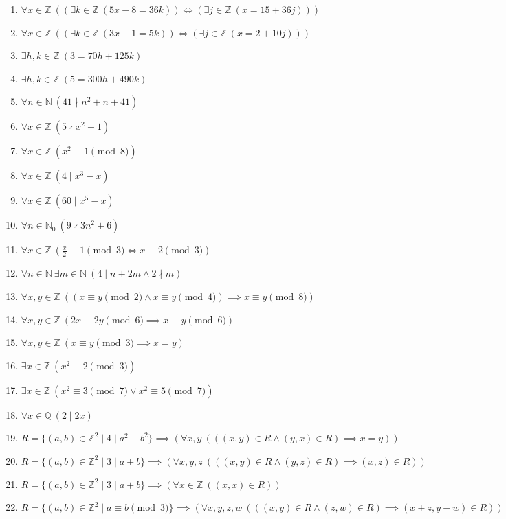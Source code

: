 \documentclass[11pt,a4paper]{article}
\begin{document}
\begin{enumerate}
\item $\displaystyle \forall x \in \mathbb{Z}\ ((\exists k \in \mathbb{Z}\ (5x - 8 = 36k)) \iff (\exists j \in \mathbb{Z}\ (x = 15 + 36j)))$
\item $\displaystyle \forall x \in \mathbb{Z}\ ((\exists k \in \mathbb{Z}\ (3x - 1 = 5k)) \iff (\exists j \in \mathbb{Z}\ (x = 2 + 10j)))$
\item $\displaystyle \exists h, k \in \mathbb{Z}\ (3 = 70h + 125k)$
\item $\displaystyle \exists h, k \in \mathbb{Z}\ (5 = 300h + 490k)$
\item $\displaystyle \forall n \in \mathbb{N}\ (41 \nmid n^{2} + n + 41)$
\item $\displaystyle \forall x \in \mathbb{Z}\ (5 \nmid x^{2} + 1)$
\item $\displaystyle \forall x \in \mathbb{Z}\ (x^{2} \equiv 1 \pmod{8})$
\item $\displaystyle \forall x \in \mathbb{Z}\ (4 \mid x^{3} - x)$
\item $\displaystyle \forall x \in \mathbb{Z}\ (60 \mid x^{5} - x)$
\item $\displaystyle \forall n \in \mathbb{N}_{0}\ (9 \nmid 3n^{2} + 6)$
\item $\displaystyle \forall x \in \mathbb{Z}\ (\frac{x}{2} \equiv 1 \pmod{3} \iff x \equiv 2 \pmod{3})$
\item $\displaystyle \forall n \in \mathbb{N}\ \exists m \in \mathbb{N}\ (4 \mid n + 2m \land 2 \nmid m)$
\item $\displaystyle \forall x, y \in \mathbb{Z}\ ((x \equiv y \pmod{2} \land x \equiv y \pmod{4}) \implies x \equiv y \pmod{8})$
\item $\displaystyle \forall x, y \in \mathbb{Z}\ (2x \equiv 2y \pmod{6} \implies x \equiv y \pmod{6})$
\item $\displaystyle \forall x, y \in \mathbb{Z}\ (x \equiv y \pmod{3} \implies x = y)$
\item $\displaystyle \exists x \in \mathbb{Z}\ (x^{2} \equiv 2 \pmod{3})$
\item $\displaystyle \exists x \in \mathbb{Z}\ (x^{2} \equiv 3 \pmod{7} \lor x^{2} \equiv 5 \pmod{7})$
\item $\displaystyle \forall x \in \mathbb{Q}\ (2 \mid 2x)$
\item $\displaystyle R = \{(a, b) \in \mathbb{Z}^{2} \mid 4 \mid a^{2} - b^{2}\} \implies (\forall x, y\ (((x, y) \in R \land (y, x) \in R) \implies x = y))$
\item $\displaystyle R = \{(a, b) \in \mathbb{Z}^{2} \mid 3 \mid a + b\} \implies (\forall x, y, z\ (((x, y) \in R \land (y, z) \in R) \implies (x, z) \in R))$
\item $\displaystyle R = \{(a, b) \in \mathbb{Z}^{2} \mid 3 \mid a + b\} \implies (\forall x \in \mathbb{Z}\ ((x, x) \in R))$
\item $\displaystyle R = \{(a, b) \in \mathbb{Z}^{2} \mid a \equiv b \pmod{3}\} \implies (\forall x, y, z, w\ (((x, y) \in R \land (z, w) \in R) \implies (x + z, y - w) \in R))$
\end{enumerate}
\end{document}
